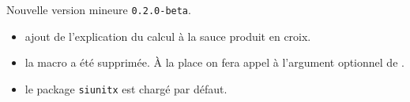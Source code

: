 Nouvelle version mineure \verb+0.2.0-beta+.

\begin{itemize}[itemsep=.5em]
    \item {} ajout de l'explication du calcul à la sauce produit en croix.


    \item {} la macro  a été supprimée. À la place on fera appel à l'argument optionnel de .


    \item {} le package \verb#siunitx# est chargé par défaut.
\end{itemize}

\separation
